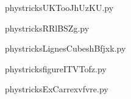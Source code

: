     

    \clearpage
    


    \newcommand{\CaptionFigUKTooJhUzKU}{<+Type your caption here+>}
    \begin{center}
        
    \end{center}
    phystricksUKTooJhUzKU.py

    

    \clearpage
    


    \newcommand{\CaptionFigRRlBSZg}{<+Type your caption here+>}
    \begin{center}
        
    \end{center}
    phystricksRRlBSZg.py

    

    \clearpage
    


    \newcommand{\CaptionFigLignesCubeshBfjxk}{<+Type your caption here+>}
    \begin{center}
        
    \end{center}
    phystricksLignesCubeshBfjxk.py

    

    \clearpage
    


    \newcommand{\CaptionFigfigureITVTofz}{<+Type your caption here+>}
    \begin{center}
        
    \end{center}
    phystricksfigureITVTofz.py

    

    \clearpage
    


    \newcommand{\CaptionFigExCarrexvfvre}{<+Type your caption here+>}
    \begin{center}
        
    \end{center}
    phystricksExCarrexvfvre.py

    

    \clearpage
    


